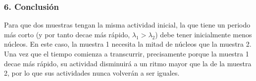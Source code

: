\subsubsection*{6. Conclusión}
\begin{cajaconclusion}
Para que dos muestras tengan la misma actividad inicial, la que tiene un periodo más corto (y por tanto decae más rápido, $\lambda_1 > \lambda_2$) debe tener inicialmente menos núcleos. En este caso, la muestra 1 necesita la mitad de núcleos que la muestra 2. Una vez que el tiempo comienza a transcurrir, precisamente porque la muestra 1 decae más rápido, su actividad disminuirá a un ritmo mayor que la de la muestra 2, por lo que sus actividades nunca volverán a ser iguales.
\end{cajaconclusion}

\newpage